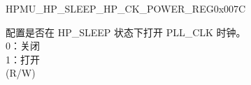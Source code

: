 \begin{register}{H}{PMU\_HP\_SLEEP\_HP\_CK\_POWER\_REG}{0x007C}\label{regdesc:PMUHPSLEEPHPCKPOWERREG}
%
%
%
\regnewline%
\begin{regdesc}\begin{reglist}
\label{fielddesc:PMUHPSLEEPXPDBBPLL}\item [PMU\_HP\_SLEEP\_XPD\_BBPLL] 配置是否在 HP\_SLEEP 状态下打开 PLL\_CLK 时钟。 \\
0：关闭\\
1：打开\\
(R/W)
\end{reglist}\end{regdesc}
\end{register}


